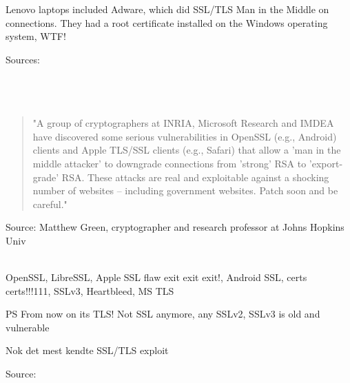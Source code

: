 \documentclass[Screen16to9,17pt]{foils}
\begin{document}

Lenovo laptops included Adware, which did SSL/TLS Man in the Middle on connections.
They had a root certificate installed on the Windows operating system, WTF!

{\footnotesize Sources:\\
\\
\\
\\
}{\tiny{}
}




\begin{quote}\small
"A group of cryptographers at INRIA, Microsoft Research and IMDEA have discovered some serious vulnerabilities in OpenSSL (e.g., Android) clients and Apple TLS/SSL clients (e.g., Safari) that allow a 'man in the middle attacker' to downgrade connections from 'strong' RSA to 'export-grade' RSA. These attacks are real and exploitable against a shocking number of websites -- including government websites. Patch soon and be careful."
\end{quote}

Source: Matthew Green, cryptographer and research professor at Johns Hopkins Univ\\
{\footnotesize{}\\
 
}

OpenSSL, LibreSSL, Apple SSL flaw exit exit exit!, Android SSL, certs certs!!!111, SSLv3, Heartbleed, MS TLS


\vskip 1cm
PS From now on its TLS! Not SSL anymore, any SSLv2, SSLv3 is old and vulnerable



\centerline{Nok det mest kendte SSL/TLS exploit}

Source: 


\end{document}

